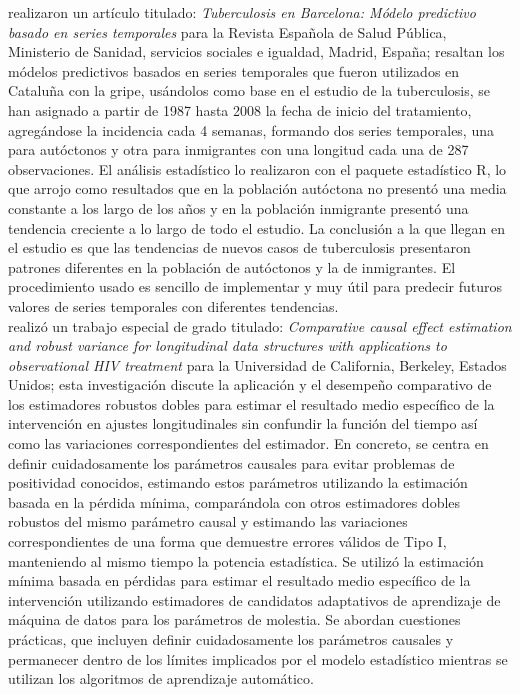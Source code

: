 \textit{\citet{tuberculosis}} realizaron un art\'iculo titulado: \textit{Tuberculosis en Barcelona: M\'odelo predictivo basado en series temporales} para la Revista Espa\~nola de Salud P\'ublica, Ministerio de Sanidad, servicios sociales e igualdad, Madrid, Espa\~na; resaltan los m\'odelos predictivos basados en series temporales que fueron utilizados en Catalu\~na con la gripe, us\'andolos como base en el estudio de la tuberculosis, se han asignado a partir de 1987 hasta 2008 la fecha de inicio del tratamiento, agreg\'andose la incidencia cada 4 semanas, formando dos series temporales, una para aut\'octonos y otra para inmigrantes con una longitud cada una de 287 observaciones. El an\'alisis estad\'istico lo realizaron con el paquete estad\'istico R, lo que arrojo como resultados que en la poblaci\'on aut\'octona no present\'o una media constante a los largo de los a\~nos y en la poblaci\'on inmigrante present\'o una tendencia creciente a lo largo de todo el estudio. La conclusi\'on a la que llegan en el estudio es que las tendencias de nuevos casos de tuberculosis presentaron patrones diferentes en la poblaci\'on de aut\'octonos y la de inmigrantes. El procedimiento usado es sencillo de implementar y muy \'util para predecir futuros valores de series temporales con diferentes tendencias.\\

\citet{hiv} realiz\'o un trabajo especial de grado titulado: \textit{Comparative causal effect estimation and robust variance for longitudinal data structures with applications to observational HIV treatment} para la Universidad de California, Berkeley, Estados Unidos; esta investigaci\'on discute la aplicaci\'on y el desempe\~no comparativo de los estimadores robustos dobles para estimar el resultado medio espec\'ifico de la intervenci\'on en ajustes longitudinales sin confundir la funci\'on del tiempo as\'i como las variaciones correspondientes del estimador. En concreto, se centra en definir cuidadosamente los par\'ametros causales para evitar problemas de positividad conocidos, estimando estos par\'ametros utilizando la estimaci\'on basada en la p\'erdida m\'inima, compar\'andola con otros estimadores dobles robustos del mismo par\'ametro causal y estimando las variaciones correspondientes de una forma que demuestre errores v\'alidos de Tipo I, manteniendo al mismo tiempo la potencia estad\'istica.  Se utiliz\'o la estimaci\'on m\'inima basada en p\'erdidas para estimar el resultado medio espec\'ifico de la intervenci\'on utilizando estimadores de candidatos adaptativos de aprendizaje de m\'aquina de datos para los par\'ametros de molestia. Se abordan cuestiones pr\'acticas, que incluyen definir cuidadosamente los par\'ametros causales y permanecer dentro de los l\'imites implicados por el modelo estad\'istico mientras se utilizan los algoritmos de aprendizaje autom\'atico.\\

